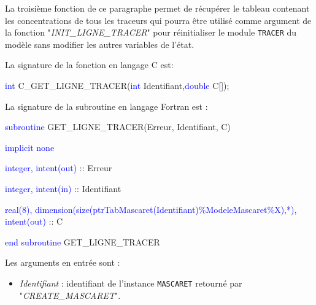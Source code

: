 \documentclass[a4paper,11pt]{article}
\begin{document}
 \hspace*{1cm}
 
 La troisi\`eme fonction de ce paragraphe permet de r\'ecup\'erer le
 tableau contenant les concentrations de tous les traceurs qui
 pourra \^etre utilis\'e comme argument de la fonction
 "\textit{INIT\_LIGNE\_TRACER}" pour r\'einitialiser le module \texttt{TRACER} du mod\`ele
 sans modifier les autres variables de l'\'etat.
 
 \vspace{0.5cm}
 
 La signature de la fonction en langage C est:
 
 \vspace{0.5cm}
 
 \textcolor{blue}{int} C\_GET\_LIGNE\_TRACER(\textcolor{blue}{int} Identifiant,\textcolor{blue}{double} C[]);
 
 \vspace{0.5cm} 
 
 La signature de la subroutine en langage Fortran est :
 
 \vspace{0.5cm}
 
    \textcolor{blue}{subroutine} GET\_LIGNE\_TRACER(Erreur, Identifiant, C)
    
        \hspace{1cm}\textcolor{blue}{implicit none}                 
        
        \hspace{1cm} \textcolor{blue}{integer, intent(out)} :: Erreur
        
        \hspace{1cm} \textcolor{blue}{integer, intent(in)}  :: Identifiant
        
        \hspace{1cm} \textcolor{blue}{real(8), dimension(size(ptrTabMascaret(Identifiant)\%ModeleMascaret\%X),*), intent(out)} :: C
        
    \textcolor{blue}{end subroutine} GET\_LIGNE\_TRACER

 \vspace{0.5cm}

 Les arguments en entr\'ee sont :
 
 \vspace{0.5cm}
 
 \begin{itemize} 
    \item \textit{Identifiant} : identifiant de l'instance \texttt{MASCARET} retourn\'e par "\textit{CREATE\_MASCARET}".
 \end{itemize}
\end{document}
